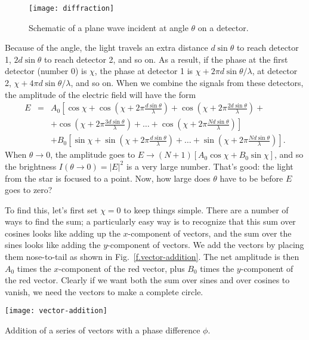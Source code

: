 \begin{figure}[hb]
\texttt{[image: diffraction]}
\caption[A plane wave incident on a detector]{Schematic of a plane wave incident at angle $\theta$ on a detector.}
\label{f.diffraction}
\end{figure}

Because of the angle, the light travels an extra distance $d\sin\theta$ to reach detector 1, $2d\sin\theta$ to reach detector 2, and so on.  As a result, if the phase at the first detector (number 0) is $\chi$, the phase at detector 1 is $\chi + 2\pi d\sin\theta/\lambda$, at detector 2,  $\chi + 4\pi d\sin\theta/\lambda$, and so on.  When we combine the signals from these detectors, the amplitude of the electric field will have the form
\begin{eqnarray*}
E &=& A_{0}\left[\cos\chi + \cos\left(\chi + 2\pi\frac{d\sin\theta}{\lambda}\right)
	+ \cos\left(\chi + 2\pi\frac{2d\sin\theta}{\lambda}\right) + \right.\\
	&&	+ \left.\cos\left(\chi + 2\pi\frac{3d\sin\theta}{\lambda}\right) + \ldots 
	+ \cos\left(\chi + 2\pi\frac{Nd\sin\theta}{\lambda}\right)\right]\\
	&& + B_{0}\left[ \sin\chi + \sin\left(\chi + 2\pi\frac{d\sin\theta}{\lambda}\right) 
		+ \ldots + \sin\left(\chi+2\pi\frac{Nd\sin\theta}{\lambda}\right)\right].
\end{eqnarray*}
When $\theta \to 0$, the amplitude goes to $E \to (N+1)\left[A_{0}\cos\chi + B_{0}\sin\chi\right]$, and so the brightness $I(\theta\to 0) = |E|^{2}$ is a very large number.  That's good: the light from the star is focused to a point. Now, how large does $\theta$ have to be before $E$ goes to zero?

To find this, let's first set $\chi = 0$ to keep things simple. There are a number of ways to find the sum; a particularly easy way is to recognize that this sum over cosines looks like adding up the $x$-component of vectors, and the sum over the sines looks like adding the $y$-component of vectors.  We add the vectors by placing them nose-to-tail as shown in Fig.~\ref{f.vector-addition}.  The net amplitude is then $A_{0}$ times the $x$-component of the red vector, plus $B_{0}$ times the $y$-component of the red vector.  Clearly if we want both the sum over sines and over cosines to vanish, we need the vectors to make a complete circle.

\begin{marginfigure}
\centering\texttt{[image: vector-addition]}
\caption[Addition of vectors with phase differences]{Addition of a series of vectors with a phase difference $\phi$.}
\label{f.vector-addition}
\end{marginfigure}

